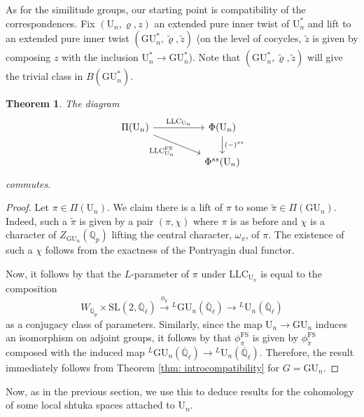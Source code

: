 \documentclass[reqno,11pt]{amsart}
\newtheorem{theorem}{Theorem}[section]
\theoremstyle{remark}
\newcommand{\GU}{\mathrm{GU}}
\newcommand{\U}{\mathrm{U}}
\newcommand{\Q}{\mathbb{Q}}
\newcommand{\SL}{\mathrm{SL}}
\newcommand{\LLC}{\mathrm{LLC}}
\def\ol{\overline}
\def\ra{\rightarrow}
\begin{document}
As for the similitude groups, our starting point is compatibility of the correspondences. Fix $(\U_n, \varrho, z)$ an extended pure inner twist of $\U^*_n$ and lift to an extended pure inner twist $(\GU^*_n, \tilde{\varrho}, \tilde{z})$ (on the level of cocycles, $\tilde{z}$ is given by composing $z$ with the inclusion $\U^*_n \to \GU^*_n$). Note that $(\GU^*_n, \tilde{\varrho}, \tilde{z})$ will give the trivial class in $B(\GU^*_n)$.
\begin{theorem}{\label{Uncompatibility}}
The diagram 
\begin{equation*}
\begin{tikzcd}[ampersand replacement=\&]
            \Pi(\U_{n})  \ar[rr, "\LLC_{\U_{n}}"] \arrow[drr, swap,"\LLC^{\mathrm{FS}}_{\U_{n}}"] \& \&   \Phi(\U_{n}) \ar[d,"(-)^{ss}"] \\
            \& \& \Phi^{ss}(\U_{n})
        \end{tikzcd}
\end{equation*}
commutes. 
\end{theorem}
\begin{proof}
Let $\pi \in \Pi(\U_n)$. We claim there is a lift of $\pi$ to some $\tilde{\pi} \in \Pi(\GU_n)$. Indeed, such a $\tilde{\pi}$ is given by a pair $(\pi, \chi)$ where $\pi$ is as before and $\chi$ is a character of $Z_{\GU_n}(\Q_p)$ lifting the central character, $\omega_{\pi}$, of $\pi$. The existence of such a $\chi$ follows from the exactness of the Pontryagin dual functor.

Now, it follows by \cite[\S2.3]{BMN} that the $L$-parameter of $\pi$ under $\LLC_{\mathrm{U}_{n}}$ is equal to the composition 
\[ W_{\mathbb{Q}_{p}} \times \SL(2,\ol{\mathbb{Q}}_{\ell}) \xrightarrow{\phi_{\tilde{\pi}}} \phantom{}^{L}\GU_{n}(\ol{\mathbb{Q}}_{\ell}) \ra \phantom{}^{L}\U_{n}(\ol{\mathbb{Q}}_{\ell}) \]
as a conjugacy class of parameters. Similarly, since the map $\U_{n} \ra \GU_{n}$ induces an isomorphism on adjoint groups, it follows by \cite[Theorem~I.9.6 (v)]{FS} that $\phi_{\pi}^{\mathrm{FS}}$ is given by $\phi_{\tilde{\pi}}^{\mathrm{FS}}$ composed with the induced map $\phantom{}^{L}\GU_{n}(\ol{\mathbb{Q}}_{\ell}) \ra \phantom{}^{L}\U_{n}(\ol{\mathbb{Q}}_{\ell})$. Therefore, the result immediately follows from Theorem \ref{thm: introcompatibility} for $G = \GU_{n}$. 
\end{proof}
Now, as in the previous section, we use this to deduce results for the cohomology of some local shtuka spaces attached to $\U_{n}$. 
\end{document}
